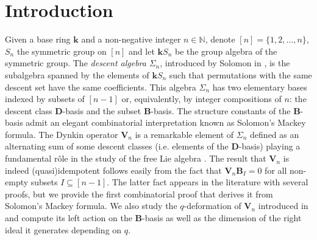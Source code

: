 \documentclass[revision]{FPSAC2025}
\begin{document}
\section{Introduction}
Given a base ring $\mathbf{k}$ and a non-negative integer $n \in \mathbb{N}$, denote $[n]=\{1, 2, \dots, n\}$,  $S_n$ the symmetric group on $[n]$ and let $\mathbf{k}S_n$ be the group algebra of the symmetric group.
The \emph{descent algebra} $\Sigma_n$, introduced by Solomon in \cite{Sol76}, is the subalgebra spanned by the elements of  $\mathbf{k}S_n$ such that permutations with the same descent set have the same coefficients.
This algebra $\Sigma_n$ has two elementary bases indexed by subsets of $[n-1]$ or, equivalently, by integer compositions of $n$: the descent class $\mathbf{D}$-basis and the subset $\mathbf{B}$-basis.
The structure constants of the $\mathbf{B}$-basis admit an elegant combinatorial interpretation %
known as Solomon's Mackey formula.
The Dynkin operator $\mathbf{V}_n$ is a remarkable element of $\Sigma_n$ defined as an alternating sum of some descent classes (i.e. elements of the $\mathbf{D}$-basis) playing a fundamental rôle in the study of the free Lie algebra \cite[(8.4.2)]{Reutenauer1993}.
The result that $\mathbf{V}_n$ is indeed (quasi)idempotent follows easily from the fact that $\mathbf{V}_n \mathbf{B}_I = 0$ for all non-empty subsets $I \subseteq [n-1]$.
The latter fact appears in the literature with several proofs, but we provide the first combinatorial proof that derives it from Solomon's Mackey formula.
We also study the $q$-deformation of $\mathbf{V}_n$ introduced in \cite{CalderbankHanlonSundaram94} and compute its left action on the $\mathbf{B}$-basis
as well as the dimension of the right ideal it generates depending on $q$.
\end{document}
